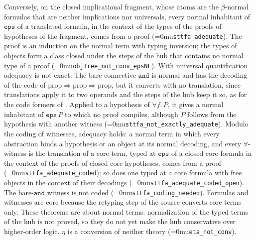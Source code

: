 \documentclass[11pt]{article}
\newcommand{\leanname}[1]{\textup{\Urlmuskip=0mu\relax\nolinkurl{#1}}}
\theoremstyle{definition}
\theoremstyle{remark}
\begin{document}
Conversely, on the closed implicational fragment, whose atoms are the
$\beta$-normal formulas that are neither implications nor universals, every
normal inhabitant of $\mathtt{eps}$ of a translated formula, in the context of
the types of the proofs of hypotheses of the fragment, comes from a proof
(\leanname{sttfa_adequate}). The proof is an induction on the normal term with
typing inversion; the types of objects form a class closed under the steps of
the hub that contains no normal type of a proof
(\leanname{objTree_not_conv_epsNF}). With universal quantification adequacy is
not exact. The bare connective $\mathtt{and}$ is normal and has the decoding of
the code of $\mathrm{prop}\Rightarrow\mathrm{prop}\Rightarrow\mathrm{prop}$, but
it converts with no translation, since translations apply it to two operands
and the steps of the hub keep it so, as for the code formers of
\cite{CousineauDowekPTS}. Applied to a hypothesis of $\forall f.\,P$, it gives a
normal inhabitant of $\mathtt{eps}\,P$ to which no proof compiles, although $P$
follows from the hypothesis with another witness
(\leanname{sttfa_not_exactly_adequate}). Modulo the coding of witnesses,
adequacy holds: a normal term in which every abstraction binds a hypothesis or
an object at its normal decoding, and every $\forall$-witness is the translation
of a core term, typed at $\mathtt{eps}$ of a closed core formula in the context
of the proofs of closed core hypotheses, comes from a proof
(\leanname{sttfa_adequate_coded}); so does one typed at a core formula with free
objects in the context of their decodings
(\leanname{sttfa_adequate_coded_open}). The bare-$\mathtt{and}$ witness is not
coded (\leanname{sttfa_coding_needed}). Formulas and witnesses are core because
the retyping step of the source converts core terms only. These theorems are
about normal terms: normalization of the typed terms of the hub is not proved,
so they do not yet make the hub conservative over higher-order logic. $\eta$ is
a conversion of neither theory (\leanname{eta_not_conv}).
\end{document}
